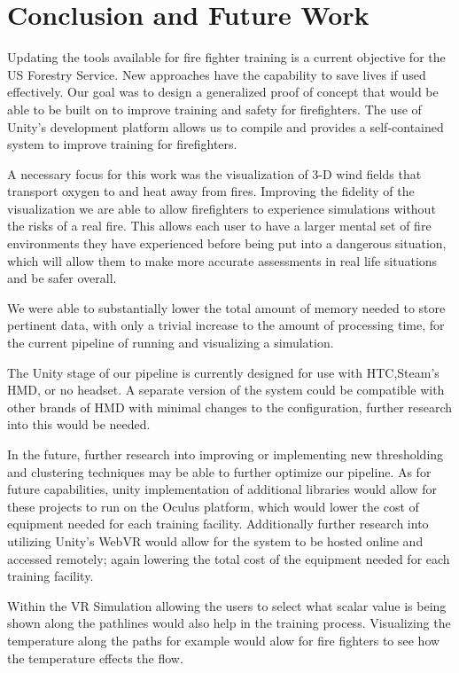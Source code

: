 
\chapter{Conclusion and Future Work} %

\label{Chapter4} %

Updating the tools available for fire fighter training is a current objective for the US Forestry Service. New approaches have the capability to save lives if used effectively. Our goal was to design a generalized proof of concept that would be able to be built on to improve training and safety for firefighters. The use of Unity’s development platform allows us to compile and provides a self-contained system to improve training for firefighters. \par
A necessary focus for this work was the visualization of 3-D wind fields that transport oxygen to and heat away from fires. Improving the fidelity of the visualization we are able to allow firefighters to experience simulations without the risks of a real fire. This allows  each user to have a larger mental set of fire environments they have experienced before being put into a dangerous situation, which will allow them to make more accurate assessments in real life situations and be safer overall. \par
We were able to substantially lower the total amount of memory needed to store pertinent data, with only a trivial increase to the amount of processing time, for the current pipeline of running and visualizing a simulation. \par
The Unity stage of our pipeline is currently designed for use with HTC,Steam’s HMD, or no headset. A separate version of the system could be compatible with other brands of HMD with minimal changes to the configuration, further research into this would be needed. \par
In the future, further research into improving or implementing new thresholding and clustering techniques may be able to further optimize our pipeline. As for future capabilities, unity implementation of additional libraries would allow for these projects to run on the Oculus platform, which would lower the cost of equipment needed for each training facility. Additionally further research into utilizing Unity’s WebVR would allow for the system to be hosted online and accessed remotely; again lowering the total cost of the equipment needed for each training facility.\par

Within the VR Simulation allowing the users to select what scalar value is being shown along the pathlines would also help in the training process. Visualizing the temperature along the paths for example would alow for fire fighters to see how the temperature  effects the flow. 


